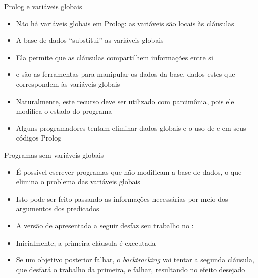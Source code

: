 \begin{frame}[fragile]{Prolog e variáveis globais}

    \begin{itemize}
        \item Não há variáveis globais em Prolog: as variáveis são locais às cláusulas

        \item A base de dados ``substitui'' as variáveis globais

        \item Ela permite que as cláusulas compartilhem informações entre si

        \item {} e  são as ferramentas para 
            manipular os dados da base, dados estes que correspondem às variáveis globais

        \item Naturalmente, este recurso deve ser utilizado com parcimônia, pois 
            ele modifica o estado do programa

        \item Alguns programadores tentam eliminar dados globais e o uso de 
             e  em seus códigos Prolog
 
    \end{itemize}

\end{frame}

\begin{frame}[fragile]{Programas sem variáveis globais}

    \begin{itemize}

        \item É possível escrever programas que não modificam a base de dados, o que elimina o 
            problema das variáveis globais

        \item Isto pode ser feito passando as informações necessárias por meio dos argumentos 
            dos predicados

        \item A versão de  apresentada a seguir desfaz seu trabalho no 
            :


        \item Inicialmente, a primeira cláusula é executada

        \item Se um objetivo posterior falhar, o \textit{backtracking} vai tentar a segunda 
            cláusula, que desfará o trabalho da primeira, e falhar, resultando no efeito 
            desejado

    \end{itemize}

\end{frame}
